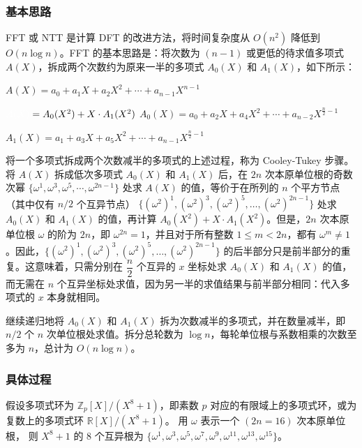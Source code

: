 \subsubsection{基本思路}
\label{subsec:ntt-forward-overview}

FFT 或 NTT 是计算 DFT 的改进方法，将时间复杂度从 $O(n^2)$ 降低到 $O(n \log n)$。FFT 的基本思路是：将次数为 $(n-1)$ 或更低的待求值多项式 $A(X)$，拆成两个次数约为原来一半的多项式 $A_0(X)$ 和 $A_1(X)$，如下所示：


$A(X) = a_0 + a_1X + a_2X^2 + \cdots + a_{n-1}X^{n - 1}$

$\textcolor{white}{A(X) }= A_0(X^2) + X \cdot A_1(X^2)$
$A_0(X) = a_0 + a_2X + a_4X^2 + \cdots + a_{n-2}X^{\frac{n}{2} - 1}$

$A_1(X) = a_1 + a_3X + a_5X^2 + \cdots + a_{n-1}X^{\frac{n}{2} - 1}$

将一个多项式拆成两个次数减半的多项式的上述过程，称为 Cooley-Tukey 步骤。将 $A(X)$ 拆成低次多项式 $A_0(X)$ 和 $A_1(X)$ 后，在 $2n$ 次本原单位根的奇数次幂 $\{\omega^1, \omega^3, \omega^5, \cdots, \omega^{2n-1}\}$ 处求 $A(X)$ 的值，等价于在所列的 $n$ 个平方节点（其中仅有 $n/2$ 个互异节点） $\{(\omega^2)^1, (\omega^2)^3, (\omega^2)^5, \ldots, (\omega^2)^{2n-1}\}$ 处求 $A_0(X)$ 和 $A_1(X)$ 的值，再计算 $A_0(X^2) + X\cdot A_1(X^2)$。但是，$2n$ 次本原单位根 $\omega$ 的阶为 $2n$，即 $\omega^{2n} = 1$，并且对于所有整数 $1\le m < 2n$，都有 $\omega^m \neq 1$。因此，$\{(\omega^2)^1, (\omega^2)^3, (\omega^2)^5, \ldots, (\omega^2)^{2n-1}\}$ 的后半部分只是前半部分的重复。这意味着，只需分别在 $\dfrac{n}{2}$ 个互异的 $x$ 坐标处求 $A_0(X)$ 和 $A_1(X)$ 的值，而无需在 $n$ 个互异坐标处求值，因为另一半的求值结果与前半部分相同：代入多项式的 $x$ 本身就相同。

继续递归地将 $A_0(X)$ 和 $A_1(X)$ 拆为次数减半的多项式，并在数量减半，即 $n/2$ 个 $n$ 次单位根处求值。拆分总轮数为 $\log n$，每轮单位根与系数相乘的次数至多为 $n$，总计为 $O(n \log n)$。

\subsubsection{具体过程}
\label{subsec:ntt-forward-details}

假设多项式环为 $\mathbb{Z}_{p}[X] / (X^8 + 1)$，即素数 $p$ 对应的有限域上的多项式环，或为复数上的多项式环 $\mathbb{R}[X] / (X^8 + 1)$。
用 $\omega$ 表示一个 $(2n=16)$ 次本原单位根，
则 $X^8 + 1$ 的 8 个互异根为 $\{\omega^1, \omega^3, \omega^5, \omega^7, \omega^9, \omega^{11}, \omega^{13}, \omega^{15}\}$。


